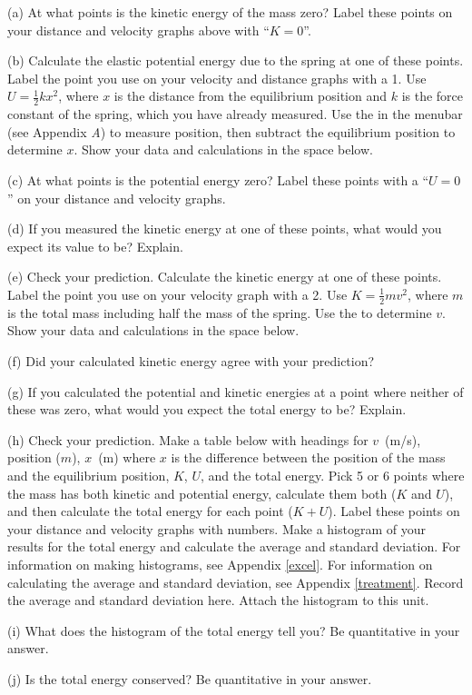 (a) At what points is the kinetic energy of the mass zero? Label these points
on your distance and velocity graphs above with ``$K=0$''.

\pagebreak[2]
(b) Calculate the elastic potential energy due to the spring at one of these
points. Label the point you use on your velocity and distance graphs with a
1. Use $U = \frac{1}{2}kx^{2}$, where  $x$ is the distance from the equilibrium 
position and $k$ is the force constant of the spring, which you have already 
measured. Use the  in the menubar (see Appendix {\it A})
to measure position, then subtract the 
equilibrium position to determine $x$. Show your data and calculations 
in the space below. 
\answerspace{20mm}

(c) At what points is the potential energy zero? Label these points with a ``$U=0$''
on your distance and velocity graphs.

(d) If you measured the kinetic energy at one of these points, what would you
expect its value to be? Explain.
\answerspace{15mm}

\pagebreak[2]
(e) Check your prediction. Calculate the kinetic energy at one of these points.
Label the point you use on your velocity graph with a 2. Use 
$K = \frac{1}{2} mv^{2}$, where $m$ is the total mass including half the mass of 
the spring. Use the  to determine $v$. Show your data and 
calculations in the space below.
\answerspace{20mm}

(f) Did your calculated kinetic energy agree with your prediction?
\answerspace{15mm}

(g) If you calculated the potential and kinetic energies at a point where 
neither of these was zero, what would you expect the total energy to be? 
Explain.
\answerspace{20mm}

\pagebreak[3]
(h) Check your prediction. Make a table below with headings for $v$~(m/s), 
position ($m$), $x$~(m) where $x$ is the difference between the position
of the mass and the equilibrium position, $K$, $U$, and the total energy.
Pick 5 or 6 points where the mass has both kinetic and
potential energy, calculate them both ($K$ and $U$), and then calculate the 
total energy for each point ($K+U$). Label these points on your distance
and velocity graphs with numbers. 
Make a histogram of your results for the total energy and calculate the 
average and standard deviation.
For information on making histograms, see Appendix \ref{excel}. For information 
on calculating the average and standard deviation, see Appendix \ref{treatment}. 
Record the average and standard deviation here.
Attach the histogram to this unit.
\answerspace{80mm}

(i) What does the histogram of the total energy tell you? Be quantitative in 
your answer.
\answerspace{20mm}

(j) Is the total energy conserved?  Be quantitative in your answer.
\answerspace{20mm}

